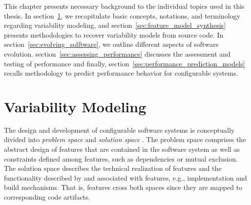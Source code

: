 This chapter presents necessary background to the individual topics used in this
thesis. In section~\ref{sec:variability_modeling}, we recapitulate
basic concepts, notations, and terminology regarding variability modeling, and
section~\ref{sec:feature_model_synthesis} presents methodologies to recover
variability models from source code. In section~\ref{sec:evolving_solftware}, we
outline different aspects of software evolution.
section~\ref{sec:assessing_performance} discusses the assessment and testing of
performance and finally, section~\ref{sec:performance_prediction_models} recalls methodology to predict
performance behavior for configurable systems.

\section{Variability Modeling} \label{sec:variability_modeling}
The design and development of configurable software systems is conceptually
divided into \emph{problem space} and \emph{solution space} \citep{czarnecki_generative_2000}. The problem space
comprises the abstract design of features that are contained in the software
system as well as constraints defined among features, such as dependencies or mutual exclusion.
The solution space describes the technical realization of features and the
functionality described by and associated with features, e.g., implementation
and build mechanisms. That is, features cross both spaces since they are mapped
to corresponding code artifacts.

